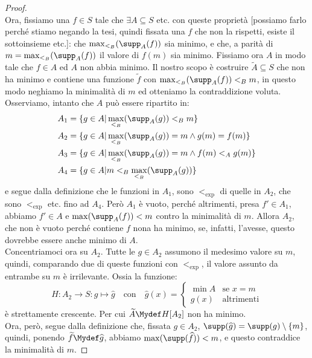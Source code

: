 \documentclass[11pt]{scrartcl}
\begin{document}
\begin{proof}
\[		\]
	Ora, fissiamo una $f \in S$ tale che $\exists A \subseteq S$ etc. con queste proprietà [possiamo farlo perché stiamo negando la tesi, quindi fissata una $f$ che non la rispetti, esiste il sottoinsieme etc.]: che $\max_{<_B}(\supp_A(f))$ sia minimo, e che, a parità di $m = \max_{<_B}(\supp_A(f))$ il valore di $f(m)$ sia minimo.
	Fissiamo ora $A$ in modo tale che $f \in A$ ed $A$ non abbia minimo. Il nostro scopo è costruire $\widetilde{A} \subseteq S$ che non ha minimo e contiene una funzione $\widetilde{f}$ con $\max_{<_B}(\supp_A(f)) <_B m$, in questo modo neghiamo la minimalità di $m$ ed otteniamo 
	la contraddizione voluta.\\
	Osserviamo, intanto che $A$ può essere ripartito in:
	\begin{align*}
		&A_1 = \{g \in A |\max_{<_B}(\supp_A(g)) <_B m\} \\
		&A_2 = \{g \in A |\max_{<_B}(\supp_A(g)) = m \land g(m) = f(m)\} \\
		&A_3 = \{g \in A |\max_{<_B}(\supp_A(g)) = m \land f(m) <_A g(m)\} \\
		&A_4 = \{g \in A |m <_B \max_{<_B}(\supp_A(g))\}
	\end{align*}
	e segue dalla definizione che le funzioni in $A_1$, sono $<_{\exp}$ di quelle in $A_2$, che sono $<_{\exp}$ etc. fino ad $A_4$.
	Però $A_1$ è vuoto, perché altrimenti, presa $f' \in A_1$, abbiamo $f' \in A$ e $\max(\supp_A(f))<m$ contro la minimalità di $m$. Allora $A_2$,
	che non è vuoto perché contiene $f$ nona ha minimo, se, infatti, l'avesse, questo dovrebbe essere anche minimo di $A$.\\
	Concentriamoci ora su $A_2$. Tutte le $g \in A_2$ assumono il medesimo valore su $m$, quindi, comparando due di queste funzioni con $<_{\exp}$, il valore assunto da entrambe su $m$ 
	è irrilevante. Ossia la funzione:
	\[ H : A_2 \rightarrow S : g \mapsto \widehat{g} \quad\text{con}\quad\widehat{g}(x) = \begin{cases}
		\min A &\text{se $x = m$}\\
		g(x) &\text{altrimenti}
	\end{cases}
		\]
	è strettamente crescente. Per cui $\widetilde{A} \Mydef H[A_2]$ non ha minimo.\\
	Ora, però, segue dalla definizione che, fissata $g \in A_2$, $\supp(\widehat{g}) = \supp(g) \setminus \{m\}$, quindi, ponendo $\widetilde{f} \Mydef \widehat{g}$, abbiamo $\max(\supp(\widehat{f}))<m$, e questo contraddice la minimalità di $m$.
\end{proof}
\end{document}
